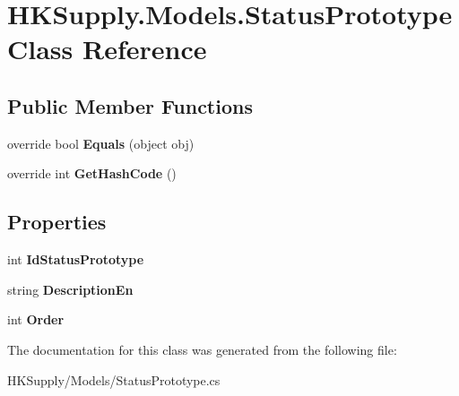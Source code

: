 \hypertarget{class_h_k_supply_1_1_models_1_1_status_prototype}{}\section{H\+K\+Supply.\+Models.\+Status\+Prototype Class Reference}
\label{class_h_k_supply_1_1_models_1_1_status_prototype}
\subsection*{Public Member Functions}
\begin{DoxyCompactItemize}
\item 
\mbox{\label{class_h_k_supply_1_1_models_1_1_status_prototype_ade6418085f372db070034705ff782747}} 
override bool {\bfseries Equals} (object obj)
\item 
\mbox{\label{class_h_k_supply_1_1_models_1_1_status_prototype_ae74f84d0212f33afa0b67be9a532b431}} 
override int {\bfseries Get\+Hash\+Code} ()
\end{DoxyCompactItemize}
\subsection*{Properties}
\begin{DoxyCompactItemize}
\item 
\mbox{\label{class_h_k_supply_1_1_models_1_1_status_prototype_abaa9fba2f8076ef3c7d9d6d0590a8036}} 
int {\bfseries Id\+Status\+Prototype}
\item 
\mbox{\label{class_h_k_supply_1_1_models_1_1_status_prototype_a01e51823d03ed620036d7522d152d25b}} 
string {\bfseries Description\+En}
\item 
\mbox{\label{class_h_k_supply_1_1_models_1_1_status_prototype_ac86a07a847a790169e6be38290b34952}} 
int {\bfseries Order}
\end{DoxyCompactItemize}


The documentation for this class was generated from the following file\+:\begin{DoxyCompactItemize}
\item 
H\+K\+Supply/\+Models/Status\+Prototype.\+cs\end{DoxyCompactItemize}
